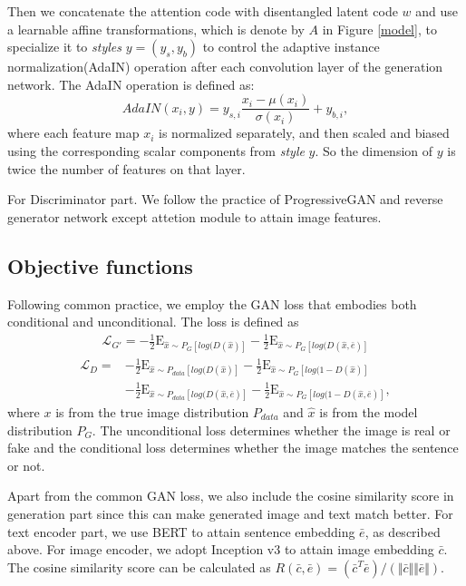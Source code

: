 \documentclass{article}
\begin{document}
Then we concatenate the attention code with disentangled latent code $w$ and use a learnable affine transformations, which is denote by $A$ in Figure \ref{model}, to specialize it to \textit{styles} $y = (y_s, y_b)$ to control the adaptive instance normalization(AdaIN) operation after each convolution layer of the generation network. The AdaIN operation is defined as:
\begin{equation}
    AdaIN(x_i, y) = y_{s,i} \frac{x_i - \mu(x_i)}{\sigma(x_i)} + y_{b,i},
\end{equation}
where each feature map $x_i$ is normalized separately, and then scaled and biased using the corresponding scalar components from \textit{style} $y$. So the dimension of $y$ is twice the number of features on that layer.

For Discriminator part. We follow the practice of ProgressiveGAN\cite{progan} and reverse generator network except attetion module to attain image features.

\subsection{Objective functions}
Following common practice, we employ the GAN loss that embodies both conditional and unconditional. The loss is defined as
\begin{align}
    \mathcal{L}_{G'} = -\frac{1}{2}\mathrm{E}_{\hat{x} \sim P_G [log(D(\hat{x})]} - \frac{1}{2}\mathrm{E}_{\hat{x} \sim P_G [log(D(\hat{x}, \bar{e})]}
\end{align}
\begin{align}
    \mathcal{L}_{D} = &-\frac{1}{2}\mathrm{E}_{\hat{x} \sim P_{data} [log(D(\hat{x})]} - \frac{1}{2}\mathrm{E}_{\hat{x} \sim P_G [log(1 - D(\hat{x})]} \nonumber \\
    &- \frac{1}{2} \mathrm{E}_{\hat{x} \sim P_{data} [log(D(\hat{x}, \bar{e})]} - \frac{1}{2}\mathrm{E}_{\hat{x} \sim P_G [log(1 - D(\hat{x}, \bar{e})]},
\end{align}
where $x$ is from the true image distribution $P_{data}$ and $\hat{x}$ is from the model distribution $P_G$. The unconditional loss determines whether the image is real or fake and the conditional loss determines whether the image matches the sentence or not.

Apart from the common GAN loss, we also include the cosine similarity score in generation part since this can make generated image and text match better. For text encoder part, we use BERT to attain sentence embedding $\bar{e}$, as described above. For image encoder, we adopt Inception v3\cite{inception} to attain image embedding $\bar{c}$. The cosine similarity score can be calculated as $R(\bar{c}, \bar{e}) = (\bar{c}^T \bar{e})/(\Vert \bar{c} \Vert \Vert \bar{e}\Vert)$.
\end{document}
